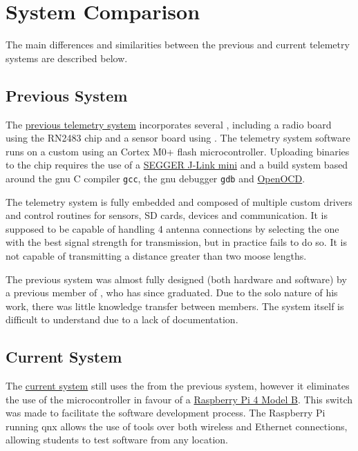 \section{System Comparison}

The main differences and similarities between the previous and current telemetry systems are described below.

\subsection{Previous System}

The \hyperref[a:prev-system]{previous  telemetry system} incorporates several 
, including a radio board using the  RN2483 chip and a sensor board using
. The telemetry system software runs on a custom  using an  Cortex
M0+ flash microcontroller. Uploading binaries to the  chip requires the use of a
\hyperref[a:jlink]{SEGGER J-Link mini} and a build system based around the \gls{gnu} C compiler \texttt{gcc}, the
\gls{gnu} debugger \texttt{gdb} and \hyperref[a:openocd]{OpenOCD}.

The telemetry system is fully embedded and composed of multiple custom drivers and control routines for sensors, SD
cards,  devices and  communication. It is supposed to be capable of handling 4
antenna connections by selecting the one with the best signal strength for transmission, but in practice fails to do
so. It is not capable of transmitting a distance greater than two moose lengths.

The previous system was almost fully designed (both hardware and software) by a previous member of
, who has since graduated. Due to the solo nature of his work, there was little knowledge
transfer between members. The system itself is difficult to understand due to a lack of documentation.

\subsection{Current System}

The \hyperref[a:cur-system]{current system} still uses the   from the previous
system, however it eliminates the use of the  microcontroller in favour of a
\hyperref[a:rpi4]{Raspberry Pi 4 Model B}. This switch was made to facilitate the software development process. The
Raspberry Pi running \gls{qnx} allows the use of  tools over both wireless and Ethernet connections,
allowing students to test software from any location.

